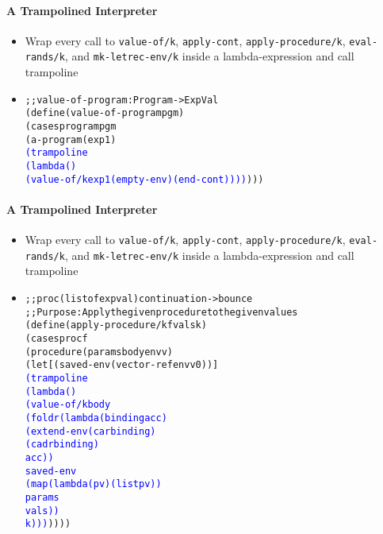 \documentclass{beamer}
\begin{document}
\begin{frame}[fragile]
\framesubtitle{A Trampolined Interpreter}
\begin{scriptsize}
\begin{itemize}
\item<1-> Wrap every call to \texttt{value-of/k}, \texttt{apply-cont}, \texttt{apply-procedure/k}, \texttt{eval-rands/k}, and \texttt{mk-letrec-env/k} inside a lambda-expression and call trampoline

\item<2-> 
\begin{alltt}
;; value-of-program : Program -> ExpVal
(define (value-of-program pgm)
  (cases program pgm
    (a-program (exp1)
     \textcolor{blue}{(trampoline 
      (lambda () 
       (value-of/k exp1 (empty-env) (end-cont))))})))
\end{alltt}

\end{itemize}
\end{scriptsize}
\end{frame}

\begin{frame}[fragile]
\framesubtitle{A Trampolined Interpreter}
\begin{scriptsize}
\begin{itemize}
\item<1-> Wrap every call to \texttt{value-of/k}, \texttt{apply-cont}, \texttt{apply-procedure/k}, \texttt{eval-rands/k}, and \texttt{mk-letrec-env/k} inside a lambda-expression and call trampoline

\item<1->
\begin{alltt}
;; proc (listof expval) continuation -> bounce
;; Purpose: Apply the given procedure to the given values
(define (apply-procedure/k f vals k)
 (cases proc f
  (procedure (params body envv)
   (let [(saved-env (vector-ref envv 0))]
    \textcolor{blue}{(trampoline
     (lambda ()
      (value-of/k body
                  (foldr (lambda (binding acc)
                          (extend-env (car binding)
                                      (cadr binding)
                                      acc))
                         saved-env
                         (map (lambda (p v) (list p v))
                              params
                              vals))
                  k)))}))))
\end{alltt}

\end{itemize}
\end{scriptsize}
\end{frame}
\end{document}
